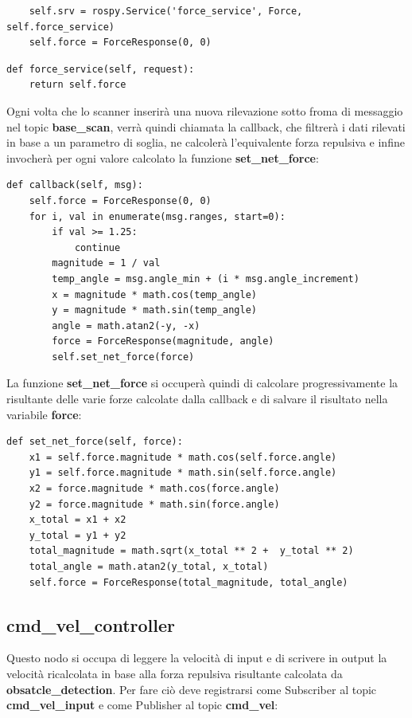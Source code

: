 \documentclass[Lau, binding=0.6cm, oneside]{sapthesis}
\begin{document}
\begin{lstlisting}
    self.srv = rospy.Service('force_service', Force, self.force_service)
    self.force = ForceResponse(0, 0)
\end{lstlisting}

\begin{lstlisting}
def force_service(self, request):
    return self.force
\end{lstlisting}

Ogni volta che lo scanner inserirà una nuova rilevazione sotto froma di messaggio nel topic \textbf{base\_scan}, verrà quindi chiamata la callback, che filtrerà i dati rilevati in base a un parametro di soglia, ne calcolerà l'equivalente forza repulsiva e infine invocherà per ogni valore calcolato la funzione \textbf{set\_net\_force}:

\begin{lstlisting}
def callback(self, msg):
    self.force = ForceResponse(0, 0)
    for i, val in enumerate(msg.ranges, start=0):
        if val >= 1.25:
            continue
        magnitude = 1 / val
        temp_angle = msg.angle_min + (i * msg.angle_increment)
        x = magnitude * math.cos(temp_angle)
        y = magnitude * math.sin(temp_angle)
        angle = math.atan2(-y, -x)
        force = ForceResponse(magnitude, angle)
        self.set_net_force(force)
\end{lstlisting}

La funzione \textbf{set\_net\_force} si occuperà quindi di calcolare progressivamente la risultante delle varie forze calcolate dalla callback e di salvare il risultato nella variabile \textbf{force}:

\begin{lstlisting}
def set_net_force(self, force):
    x1 = self.force.magnitude * math.cos(self.force.angle)
    y1 = self.force.magnitude * math.sin(self.force.angle)
    x2 = force.magnitude * math.cos(force.angle)
    y2 = force.magnitude * math.sin(force.angle)
    x_total = x1 + x2
    y_total = y1 + y2
    total_magnitude = math.sqrt(x_total ** 2 +  y_total ** 2)
    total_angle = math.atan2(y_total, x_total)
    self.force = ForceResponse(total_magnitude, total_angle)
\end{lstlisting}

\subsection{cmd\_vel\_controller}
Questo nodo si occupa di leggere la velocità di input e di scrivere in output la velocità ricalcolata in base alla forza repulsiva risultante calcolata da \textbf{obsatcle\_detection}.
Per fare ciò deve registrarsi come Subscriber al topic \textbf{cmd\_vel\_input} e come Publisher al topic \textbf{cmd\_vel}:
\end{document}

